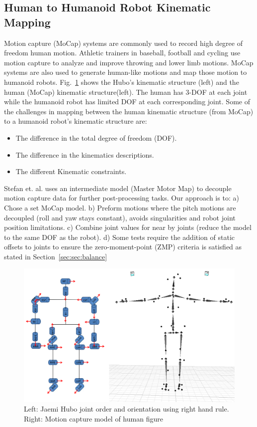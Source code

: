 \subsection{Human to Humanoid Robot Kinematic Mapping}\label{sec:sec:mocap}

Motion capture (MoCap) systems are commonly used to record high degree of freedom human motion.  
Athletic trainers in baseball, football and cycling use motion capture to analyze and improve throwing and lower limb motions\cite{Fleisig1996,barrentiine1998,Mochizuki1998,Akira1999}.
MoCap systems are also used to generate human-like motions and map those motion to humanoid robots\cite{1545060,Polland2002}.  
Fig.~\ref{fig:mocap-joints} shows the Hubo's kinematic structure (left) and the human (MoCap) kinematic structure(left).
The human has 3-DOF at each joint while the humanoid robot has limited DOF at each corresponding joint.
Some of the challenges in mapping between the human kinematic structure (from MoCap) to a humanoid robot's kinematic structure are:

\begin{itemize}
	\item The difference in the total degree of freedom (DOF). 
	\item	The difference in the kinematics descriptions. 
	\item	The different Kinematic constraints.
\end{itemize}

Stefan et. al.\cite{5756898} uses an intermediate model (Master Motor Map) to decouple motion capture data for further post-processing tasks. 
Our approach is to: 
a) Chose a set MoCap model.  
b) Preform motions where the pitch motions are decoupled (roll and yaw stays constant), avoids singularities and robot joint position limitations.  
c) Combine joint values for near by joints (reduce the model to the same DOF as the robot).  
d) Some tests require the addition of static offsets to joints to ensure the zero-moment-point (ZMP) criteria is satisfied as stated in Section~\ref{sec:sec:balance}

\begin{figure}[t]
  \centering
\includegraphics[width=1.0\columnwidth]{./pix/mocapJoints.png}
  \caption{Left: Jaemi Hubo joint order and orientation using right hand rule.  Right: Motion capture model of human figure}
  \label{fig:mocap-joints}
\end{figure}



